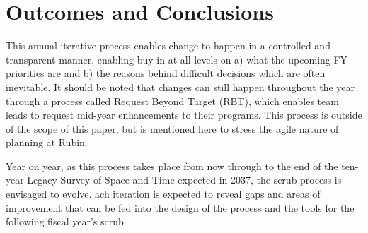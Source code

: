 \section{Outcomes and Conclusions} \label{sec:outcomes}

This annual iterative process enables change to happen in a controlled and transparent manner, enabling buy-in at all levels on a) what the upcoming FY priorities are and b) the reasons behind difficult decisions which are often inevitable. 
It should be noted that changes can still happen throughout the year through a process called Request Beyond Target (RBT), which enables team leads to request mid-year enhancements to their programs. 
This process is outside of the scope of this paper, but is mentioned here to stress the agile nature of planning at Rubin.

Year on year, as this process takes place from now through to the end of the ten-year Legacy Survey of Space and Time expected in 2037, the scrub process is envisaged to evolve.
ach iteration is expected to reveal gaps and areas of improvement that can be fed into the design of the process and the tools for the following fiscal year’s scrub.
